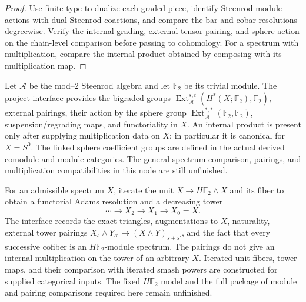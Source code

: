 \begin{proof}
  Use finite type to dualize each graded piece, identify Steenrod-module
  actions with dual-Steenrod coactions, and compare the bar and cobar
  resolutions degreewise.  Verify the internal grading, external tensor
  pairing, and sphere action on the chain-level comparison before passing to
  cohomology.  For a spectrum with multiplication, compare the internal
  product obtained by composing with its multiplication map.
\end{proof}

\begin{definition}
  \label{def:steenrod-ext}
  \notready
  Let $\mathcal A$ be the mod--$2$ Steenrod algebra and let
  $\mathbb F_2$ be its trivial module.  The project interface provides the
  bigraded groups
  $\operatorname{Ext}_{\mathcal A}^{s,t}(H^*(X;\mathbb F_2),\mathbb F_2)$,
  external pairings, their action by the sphere group
  $\operatorname{Ext}_{\mathcal A}^{*,*}(\mathbb F_2,\mathbb F_2)$,
  suspension/regrading maps, and functoriality in $X$.  An internal product is
  present only after supplying multiplication data on $X$; in particular it
  is canonical for $X=S^0$.
  The linked sphere coefficient groups are defined in the actual derived
  comodule and module categories. The general-spectrum comparison,
  pairings, and multiplication compatibilities in this node are still
  unfinished.
\end{definition}

\begin{definition}
  \label{def:hf2-adams-tower}
  \notready
  For an admissible spectrum $X$, iterate the unit
  $X\to H\mathbb F_2\wedge X$ and its fiber to obtain a functorial Adams
  resolution and a decreasing tower
  \[
    \cdots\longrightarrow X_2\longrightarrow X_1\longrightarrow X_0=X.
  \]
  The interface records the exact triangles, augmentations to $X$, naturality,
  external tower pairings
  $X_s\wedge Y_{s'}\to (X\wedge Y)_{s+s'}$, and the fact that every successive
  cofiber is an $H\mathbb F_2$-module spectrum.  The pairings do not give an
  internal multiplication on the tower of an arbitrary $X$.
  Iterated unit fibers, tower maps, and their comparison with iterated
  smash powers are constructed for supplied categorical inputs. The
  fixed $H\mathbb F_2$ model and the full package of module and pairing
  comparisons required here remain unfinished.
\end{definition}

